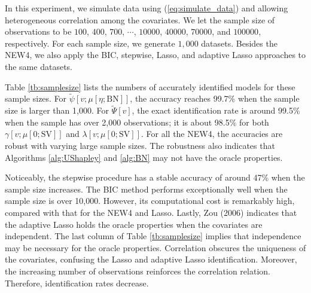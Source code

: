 \documentclass[a4paper,12pt]{article}
\begin{document}
\noindent
In this experiment, we simulate data using (\ref{eq:simulate_data}) and allowing heterogeneous correlation among the covariates. 
We let the sample size of observations to be $100$, $400$, $700$, $\cdots$, $10000$, $40000$, $70000$, and $100000$, respectively.
For each sample size, we generate $1,000$ datasets.
Besides the NEW4, we also apply the BIC, stepwise, Lasso, and adaptive Lasso approaches to the same datasets.

Table \ref{tb:samplesize} lists the numbers of accurately identified models for these sample sizes.
For $\tilde \psi[v;\mu[\eta;\mathrm{BN}]]$, the accuracy reaches 99.7\% when the sample size is larger than 1,000.
For $\tilde \Psi[v]$, the exact identification rate is around 99.5\% when the sample has over 2,000 observations;
it is about 98.5\% for both $\gamma [v;\mu[0; \mathrm{SV}]]$ and $\lambda [v;\mu[0; \mathrm{SV}]]$.
For all the NEW4, the accuracies are robust with varying large sample sizes.
The robustness also indicates that Algorithms \ref{alg:UShapley} and \ref{alg:BN} may not have the oracle properties.

Noticeably, the stepwise procedure has a stable accuracy of around 47\% when the sample size increases. 
The BIC method performs exceptionally well when the sample size is over 10,000. 
However, its computational cost is remarkably high, compared with that for the NEW4 and Lasso. Lastly, Zou (2006) indicates that the adaptive Lasso holds the oracle properties when the covariates are independent. 
The last column of Table \ref{tb:samplesize} implies that independence may be necessary for the oracle properties. 
Correlation obscures the uniqueness of the covariates, confusing the Lasso and adaptive Lasso identification. 
Moreover, the increasing number of observations reinforces the correlation relation. 
Therefore, identification rates decrease.
\end{document}
